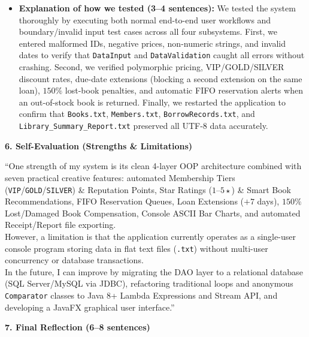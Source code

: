 \documentclass[12pt,a4paper]{article}
\begin{document}
\begin{itemize}[leftmargin=1.2cm]
    \item \textbf{Explanation of how we tested (3--4 sentences):}
    We tested the system thoroughly by executing both normal end-to-end user workflows and boundary/invalid input test cases across all four subsystems. First, we entered malformed IDs, negative prices, non-numeric strings, and invalid dates to verify that \texttt{DataInput} and \texttt{DataValidation} caught all errors without crashing. Second, we verified polymorphic pricing, VIP/GOLD/SILVER discount rates, due-date extensions (blocking a second extension on the same loan), $150\%$ lost-book penalties, and automatic FIFO reservation alerts when an out-of-stock book is returned. Finally, we restarted the application to confirm that \texttt{Books.txt}, \texttt{Members.txt}, \texttt{BorrowRecords.txt}, and \texttt{Library\_Summary\_Report.txt} preserved all UTF-8 data accurately.
\end{itemize}

\textbf{6. Self-Evaluation (Strengths \& Limitations)}

``One strength of my system is its clean 4-layer OOP architecture combined with seven practical creative features: automated Membership Tiers (\texttt{VIP}/\texttt{GOLD}/\texttt{SILVER}) \& Reputation Points, Star Ratings ($1\text{--}5\star$) \& Smart Book Recommendations, FIFO Reservation Queues, Loan Extensions ($+7$ days), $150\%$ Lost/Damaged Book Compensation, Console ASCII Bar Charts, and automated Receipt/Report file exporting.\\
However, a limitation is that the application currently operates as a single-user console program storing data in flat text files (\texttt{.txt}) without multi-user concurrency or database transactions.\\
In the future, I can improve by migrating the DAO layer to a relational database (SQL Server/MySQL via JDBC), refactoring traditional loops and anonymous \texttt{Comparator} classes to Java 8+ Lambda Expressions and Stream API, and developing a JavaFX graphical user interface.''

\textbf{7. Final Reflection (6--8 sentences)}
\end{document}
